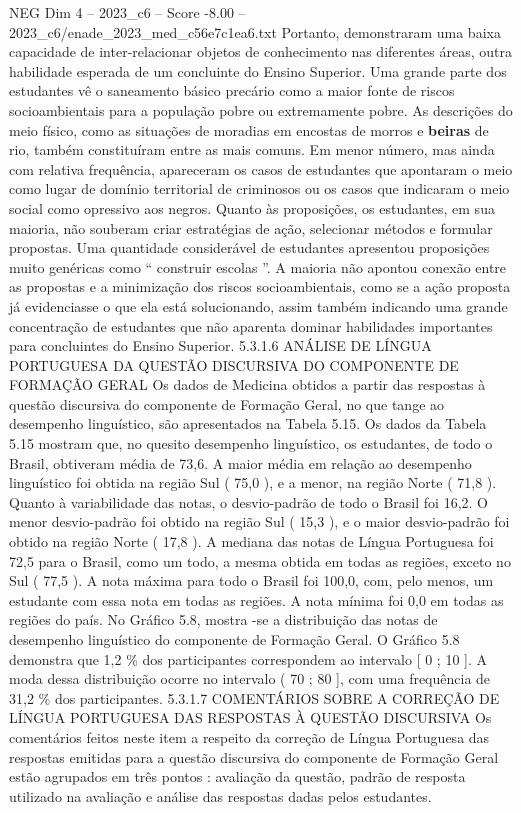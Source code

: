 \begin{textsample}{NEG Dim 4 – 2023\_c6 – Score -8.00 – 2023\_c6/enade\_2023\_med\_c56e7c1ea6.txt}
Portanto, demonstraram uma baixa capacidade de inter-relacionar objetos de conhecimento nas diferentes áreas, outra habilidade esperada de um concluinte do Ensino Superior.
Uma grande parte dos estudantes vê o saneamento básico precário como a maior fonte de riscos socioambientais para a população pobre ou extremamente pobre.
As descrições do meio físico, como as situações de moradias em encostas de morros e \textbf{beiras} de rio, também constituíram entre as mais comuns.
Em menor número, mas ainda com relativa frequência, apareceram os casos de estudantes que apontaram o meio como lugar de domínio territorial de criminosos ou os casos que indicaram o meio social como opressivo aos negros.
Quanto às proposições, os estudantes, em sua maioria, não souberam criar estratégias de ação, selecionar métodos e formular propostas.
Uma quantidade considerável de estudantes apresentou proposições muito genéricas como “ construir escolas ”.
A maioria não apontou conexão entre as propostas e a minimização dos riscos socioambientais, como se a ação proposta já evidenciasse o que ela está solucionando, assim também indicando uma grande concentração de estudantes que não aparenta dominar habilidades importantes para concluintes do Ensino Superior. 5.3.1.6 ANÁLISE DE LÍNGUA PORTUGUESA DA QUESTÃO DISCURSIVA DO COMPONENTE DE FORMAÇÃO GERAL Os dados de Medicina obtidos a partir das respostas à questão discursiva do componente de Formação Geral, no que tange ao desempenho linguístico, são apresentados na Tabela 5.15.
Os dados da Tabela 5.15 mostram que, no quesito desempenho linguístico, os estudantes, de todo o Brasil, obtiveram média de 73,6.
A maior média em relação ao desempenho linguístico foi obtida na região Sul ( 75,0 ), e a menor, na região Norte ( 71,8 ).
Quanto à variabilidade das notas, o desvio-padrão de todo o Brasil foi 16,2.
O menor desvio-padrão foi obtido na região Sul ( 15,3 ), e o maior desvio-padrão foi obtido na região Norte ( 17,8 ).
A mediana das notas de Língua Portuguesa foi 72,5 para o Brasil, como um todo, a mesma obtida em todas as regiões, exceto no Sul ( 77,5 ).
A nota máxima para todo o Brasil foi 100,0, com, pelo menos, um estudante com essa nota em todas as regiões.
A nota mínima foi 0,0 em todas as regiões do país.
No Gráfico 5.8, mostra -se a distribuição das notas de desempenho linguístico do componente de Formação Geral.
O Gráfico 5.8 demonstra que 1,2 \% dos participantes correspondem ao intervalo [ 0 ; 10 ].
A moda dessa distribuição ocorre no intervalo ( 70 ; 80 ], com uma frequência de 31,2 \% dos participantes. 5.3.1.7 COMENTÁRIOS SOBRE A CORREÇÃO DE LÍNGUA PORTUGUESA DAS RESPOSTAS À QUESTÃO DISCURSIVA Os comentários feitos neste item a respeito da correção de Língua Portuguesa das respostas emitidas para a questão discursiva do componente de Formação Geral estão agrupados em três pontos : avaliação da questão, padrão de resposta utilizado na avaliação e análise das respostas dadas pelos estudantes.

\end{textsample}
